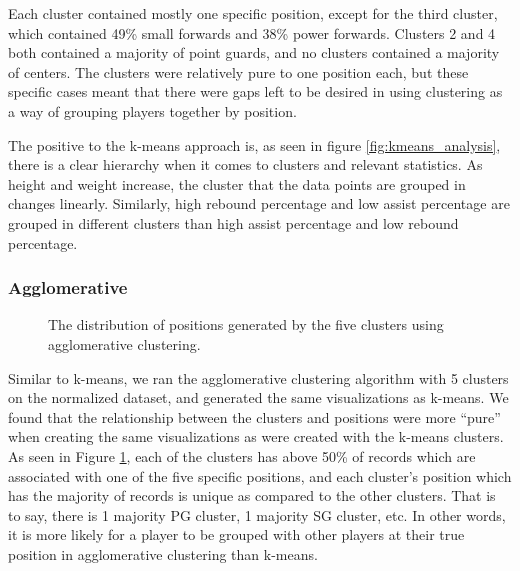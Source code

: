 \documentclass[./main.tex]{subfiles}
\begin{document}
Each cluster contained mostly one specific position, except for the third cluster, which contained 49\% small forwards and 38\% power forwards. Clusters 2 and 4 both contained a majority of point guards, and no clusters contained a majority of centers. The clusters were relatively pure to one position each, but these specific cases meant that there were gaps left to be desired in using clustering as a way of grouping players together by position.

The positive to the k-means approach is, as seen in figure \ref{fig:kmeans_analysis}, there is a clear hierarchy when it comes to clusters and relevant statistics. As height and weight increase, the cluster that the data points are grouped in changes linearly. Similarly, high rebound percentage and low assist percentage are grouped in different clusters than high assist percentage and low rebound percentage.

\subsubsection{Agglomerative}



\begin{figure}[h]
    \centering
    \caption{The distribution of positions generated by the five clusters using agglomerative clustering.}
    \label{fig:agglomerative_analysis}
\end{figure}


Similar to k-means, we ran the agglomerative clustering algorithm with 5 clusters on the normalized dataset, and generated the same visualizations as k-means. We found that the relationship between the clusters and positions were more ``pure'' when creating the same visualizations as were created with the k-means clusters. As seen in Figure \ref{fig:agglomerative_analysis}, each of the clusters has above 50\% of records which are associated with one of the five specific positions, and each cluster's position which has the majority of records is unique as compared to the other clusters. That is to say, there is 1 majority PG cluster, 1 majority SG cluster, etc. In other words, it is more likely for a player to be grouped with other players at their true position in agglomerative clustering than k-means.
\end{document}
